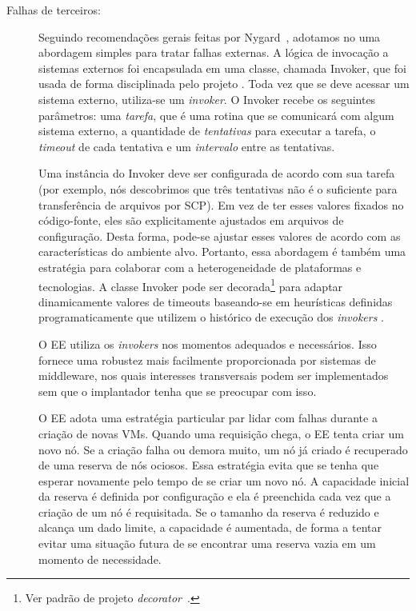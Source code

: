 \begin{description}
\item [Falhas de terceiros:]

Seguindo recomendações gerais feitas por Nygard~\cite{Nygard2009Release},
adotamos no \ee uma abordagem simples para tratar falhas externas.
A lógica de invocação a sistemas externos foi encapsulada em uma classe, 
chamada \textsf{Invoker}, que foi usada de forma disciplinada pelo projeto .
Toda vez que se deve acessar um sistema externo, utiliza-se um \emph{invoker}.
O \textsf{Invoker} recebe os seguintes parâmetros:
uma \emph{tarefa}, que é uma rotina que se comunicará com algum sistema externo,
a quantidade de \emph{tentativas} para executar a tarefa,
o \emph{timeout} de cada tentativa e um \emph{intervalo} entre as tentativas.

Uma instância do \textsf{Invoker} deve ser configurada 
de acordo com sua tarefa (por exemplo, nós descobrimos que três tentativas
não é o suficiente para transferência de arquivos por SCP).
Em vez de ter esses valores fixados no código-fonte, eles são explicitamente
ajustados em arquivos de configuração.
Desta forma, pode-se ajustar esses valores de acordo com 
as características do ambiente alvo.
Portanto, essa abordagem é também uma estratégia para colaborar 
com a heterogeneidade de plataformas e tecnologias.
A classe \textsf{Invoker} pode ser decorada\footnote{Ver padrão de projeto \emph{decorator}~\cite{GoF1995Patterns}.} 
para adaptar dinamicamente valores de timeouts 
baseando-se em heurísticas definidas programaticamente 
que utilizem o histórico de execução dos \emph{invokers} .

O EE utiliza os \emph{invokers} nos momentos adequados e necessários.
Isso fornece uma robustez mais facilmente proporcionada por sistemas de middleware,
nos quais interesses transversais podem ser implementados sem que o implantador 
tenha que se preocupar com isso.

O EE adota uma estratégia particular par lidar com falhas durante a criação de novas VMs.
Quando uma requisição chega, o EE tenta criar um novo nó.
Se a criação falha ou demora muito, um nó já criado é recuperado de uma reserva de nós ociosos.
Essa estratégia evita que se tenha que esperar novamente pelo tempo de se criar um novo nó.
A capacidade inicial da reserva é definida por configuração
e ela é preenchida cada vez que a criação de um nó é requisitada.
Se o tamanho da reserva é reduzido e alcança um dado limite,
a capacidade é aumentada, de forma a tentar evitar uma situação futura
de se encontrar uma reserva vazia em um momento de necessidade.


\end{description}
